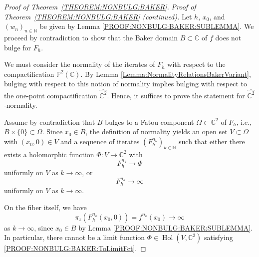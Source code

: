 \documentclass[a4paper, 12pt, twoside]{amsart}
\theoremstyle{definition}
\numberwithin{equation}{section}
\newcommand{\Hol}{\operatorname{Hol}}
\newcommand{\C}{{\mathbb C}}
\newcommand{\N}{{\mathbb N}}
\renewcommand{\P}{{\mathbb P}}
\begin{document}
\begin{proof}[Proof of Theorem~\ref{THEOREM:NONBULG:BAKER}]
\noindent\textit{Proof of Theorem~\ref{THEOREM:NONBULG:BAKER} (continued).}
	Let $h$, $x_0$, and $(w_n)_{n\in\N}$ be given by Lemma \ref{PROOF:NONBULG:BAKER:SUBLEMMA}.
    We proceed by contradiction to show that the Baker domain $B \subset \C$ of $f$ does not bulge for $F_h$. 

    We must consider the normality of the iterates of $F_h$ with respect to the compactification $\P^2(\C)$. 
    By Lemma \ref{Lemma:NormalityRelationsBakerVariant}, bulging with respect to this notion of normality implies bulging with respect to the one-point compactification $\widehat{\C^2}$.
    Hence, it suffices to prove the statement for $\widehat{\C^2}$-normality.

    Assume by contradiction that $B$ bulges to a Fatou component $\Omega \subset \C^2$ of $F_h$, i.e., $B \times \{0\} \subset \Omega$.
    Since $x_0 \in B$, the definition of normality yields an open set $V \subset \Omega$ with $(x_0, 0) \in V$ and a sequence of iterates $(F_h^{n_k})_{k\in\N}$ such that either there exists a holomorphic function $\Phi : V \to \C^2$ with
    \begin{equation}\label{PROOF:NONBULG:BAKER:ToLimitFct}
        F_h^{n_k} \to \Phi
    \end{equation}
    uniformly on $V$ as $k \to \infty$, or
    \begin{equation}\label{PROOF:NONBULG:BAKER:ToInfActual}
        F_h^{n_k} \to \infty
    \end{equation}
    uniformly on $V$ as $k \to \infty$.

    On the fiber itself, we have
    \begin{equation*}
        \pi_z (F_h^{n_k}(x_0, 0)) = f^{n_k}(x_0) \to \infty
    \end{equation*}
    as $k \to \infty$, since $x_0 \in B$ by Lemma \ref{PROOF:NONBULG:BAKER:SUBLEMMA}. 
    In particular, there cannot be a limit function $\Phi \in \Hol(V, \C^2)$ satisfying \eqref{PROOF:NONBULG:BAKER:ToLimitFct}.


\end{proof}
\end{document}
